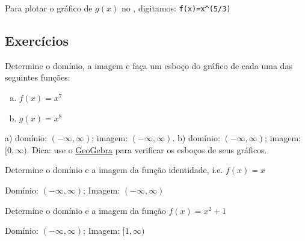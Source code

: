 \documentclass[../main.tex]{subfiles}
\begin{document}
\begin{exeresol}
\begin{resol}
\begin{enumerate}[a)]
    Para plotar o gráfico de $g(x)$ no \geogebra, digitamos: \verb|f(x)=x^(5/3)|
   \end{enumerate}
\end{resol}
\end{exeresol}

\subsection{Exercícios}
\begin{exer}
  Determine o domínio, a imagem e faça um esboço do gráfico de cada uma das seguintes funções:
  \begin{enumerate}[a)]
  \item $f(x) = x^7$
  \item $g(x) = x^8$
  \end{enumerate}
\end{exer}
\begin{resp}
  a) domínio: $(-\infty, \infty)$; imagem: $(-\infty, \infty)$. b) domínio: $(-\infty, \infty)$; imagem: $[0, \infty)$. Dica: use o \href{https://www.geogebra.org/graphing}{GeoGebra} para verificar os esboços de seus gráficos.
\end{resp}

\begin{exer}
  Determine o domínio e a imagem da função identidade, i.e. $f(x) = x$
\end{exer}
\begin{resp}
  Domínio: $(-\infty, \infty)$; Imagem: $(-\infty, \infty)$
\end{resp}

\begin{exer}
  Determine o domínio e a imagem da função $f(x) = x^2 + 1$
\end{exer}
\begin{resp}
  Domínio: $(-\infty, \infty)$; Imagem: $[1, \infty)$
\end{resp}
\end{document}
